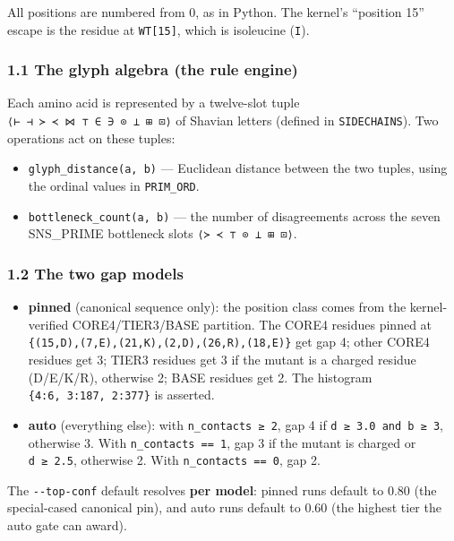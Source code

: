 \documentclass[12pt,a4paper]{article}
\providecommand{\tightlist}{%
  \setlength{\itemsep}{0pt}\setlength{\parskip}{0pt}%
}
\begin{document}
All positions are numbered from 0, as in Python. The kernel's ``position
15'' escape is the residue at \texttt{WT{[}15{]}}, which is isoleucine
(\texttt{\textquotesingle{}I\textquotesingle{}}).

\hypertarget{the-glyph-algebra-the-rule-engine}{%
\subsubsection{1.1 The glyph algebra (the rule
engine)}\label{the-glyph-algebra-the-rule-engine}}

Each amino acid is represented by a twelve-slot tuple
\texttt{⟨⊢\ ⊣\ ≻\ ≺\ ⋈\ ⊤\ ∈\ ∋\ ⊙\ ⊥\ ⊞\ ⊡⟩} of Shavian letters
(defined in \texttt{SIDECHAINS}). Two operations act on these tuples:

\begin{itemize}
\tightlist
\item
  \texttt{glyph\_distance(a,\ b)} --- Euclidean distance between the two
  tuples, using the ordinal values in \texttt{PRIM\_ORD}.
\item
  \texttt{bottleneck\_count(a,\ b)} --- the number of disagreements
  across the seven SNS\_PRIME bottleneck slots
  \texttt{⟨≻\ ≺\ ⊤\ ⊙\ ⊥\ ⊞\ ⊡⟩}.
\end{itemize}

\hypertarget{the-two-gap-models}{%
\subsubsection{1.2 The two gap models}\label{the-two-gap-models}}

\begin{itemize}
\tightlist
\item
  \textbf{pinned} (canonical sequence only): the position class comes
  from the kernel-verified CORE4/TIER3/BASE partition. The CORE4
  residues pinned at
  \texttt{\{(15,D),(7,E),(21,K),(2,D),(26,R),(18,E)\}} get gap 4; other
  CORE4 residues get 3; TIER3 residues get 3 if the mutant is a charged
  residue (D/E/K/R), otherwise 2; BASE residues get 2. The histogram
  \texttt{\{4:6,\ 3:187,\ 2:377\}} is asserted.
\item
  \textbf{auto} (everything else): with \texttt{n\_contacts\ ≥\ 2}, gap
  4 if \texttt{d\ ≥\ 3.0\ and\ b\ ≥\ 3}, otherwise 3. With
  \texttt{n\_contacts\ ==\ 1}, gap 3 if the mutant is charged or
  \texttt{d\ ≥\ 2.5}, otherwise 2. With \texttt{n\_contacts\ ==\ 0}, gap
  2.
\end{itemize}

The \texttt{-\/-top-conf} default resolves \textbf{per model}: pinned
runs default to 0.80 (the special-cased canonical pin), and auto runs
default to 0.60 (the highest tier the auto gate can award).
\end{document}
